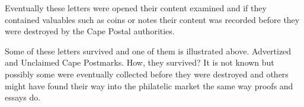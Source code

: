 Eventually these letters were opened their content examined and if 
they contained valuables such as coins or notes their content 
was recorded before they were destroyed by the Cape Postal authorities.

Some of these letters survived and one of them is illustrated above.
Advertized and Unclaimed Cape Postmarks. How, they survived? 
It is not known but possibly some were eventually collected 
before they were destroyed and others might have found their way 
into the philatelic market the same way proofs and essays do.


 
	 
  	

 


 

 

               